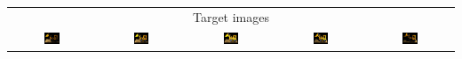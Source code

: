 \begin{table}[!htb]
\begin{tabular*}{\textwidth}{ c c c c c }
        \multicolumn{5}{c}{Target images} \\
          \includegraphics[width=0.19\textwidth]{figures/results/arb_set/dynamic_light/targ_vc0_ld-60.png}
        & \includegraphics[width=0.19\textwidth]{figures/results/arb_set/dynamic_light/targ_vc0_ld-30.png}
        & \includegraphics[width=0.19\textwidth]{figures/results/arb_set/dynamic_light/targ_vc0_ld0.png}
        & \includegraphics[width=0.19\textwidth]{figures/results/arb_set/dynamic_light/targ_vc0_ld30.png} 
        & \includegraphics[width=0.19\textwidth]{figures/results/arb_set/dynamic_light/targ_vc0_ld60.png}
        

    \end{tabular*}
    \caption{}
    \label{tab:arb_dynamic_light}
\end{table}
\endgroup